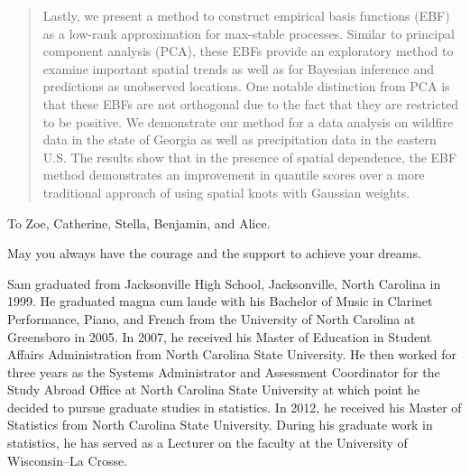 \begin{abstract}
Lastly, we present a method to construct empirical basis functions (EBF) as a low-rank approximation for max-stable processes.
Similar to principal component analysis (PCA), these EBFs provide an exploratory method to examine important spatial trends as well as for Bayesian inference and predictions as unobserved locations.
One notable distinction from PCA is that these EBFs are not orthogonal due to the fact that they are restricted to be positive.
We demonstrate our method for a data analysis on wildfire data in the state of Georgia as well as precipitation data in the eastern U.S.
The results show that in the presence of spatial dependence, the EBF method demonstrates an improvement in quantile scores over a more traditional approach of using spatial knots with Gaussian weights.

\end{abstract}


\makecopyrightpage

\maketitlepage

\begin{dedication}
 \centering To Zoe, Catherine, Stella, Benjamin, and Alice. 
 
 May you always have the courage and the support to achieve your dreams.
\end{dedication}

\begin{biography}
Sam graduated from Jacksonville High School, Jacksonville, North Carolina in 1999.
He graduated magna cum laude with his Bachelor of Music in Clarinet Performance, Piano, and French from the University of North Carolina at Greensboro in 2005.
In 2007, he received his Master of Education in Student Affairs Administration from North Carolina State University.
He then worked for three years as the Systems Administrator and Assessment Coordinator for the Study Abroad Office at North Carolina State University at which point he decided to pursue graduate studies in statistics.
In 2012, he received his Master of Statistics from North Carolina State University.
During his graduate work in statistics, he has served as a Lecturer on the faculty at the University of Wisconsin--La Crosse. 
\end{biography}

